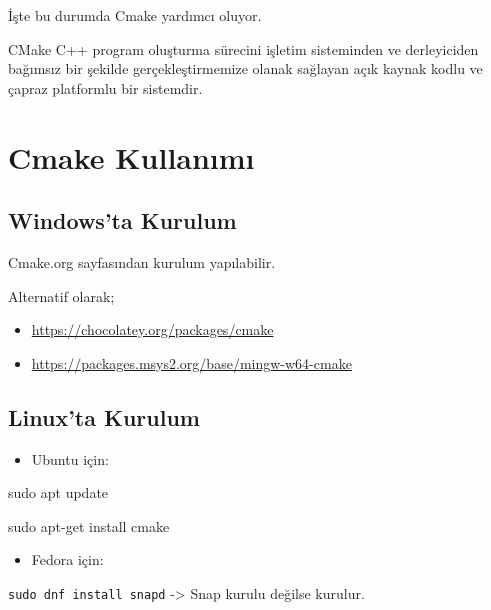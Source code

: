 \documentclass[
]{book}
\newenvironment{Shaded}{\begin{snugshade}}{\end{snugshade}}
\newcommand{\FunctionTok}[1]{\textcolor[rgb]{0.00,0.00,0.00}{#1}}
\newcommand{\NormalTok}[1]{#1}
\providecommand{\tightlist}{%
  \setlength{\itemsep}{0pt}\setlength{\parskip}{0pt}}
\begin{document}
İşte bu durumda Cmake yardımcı oluyor.

CMake C++ program oluşturma sürecini işletim sisteminden ve derleyiciden bağımsız bir şekilde gerçekleştirmemize olanak sağlayan açık kaynak kodlu ve çapraz platformlu bir sistemdir.

\hypertarget{cmake-kullanux131mux131}{%
\section{Cmake Kullanımı}\label{cmake-kullanux131mux131}}

\hypertarget{windowsta-kurulum}{%
\subsection{Windows'ta Kurulum}\label{windowsta-kurulum}}

Cmake.org sayfasından kurulum yapılabilir.

Alternatif olarak;

\begin{itemize}
\tightlist
\item
  \url{https://chocolatey.org/packages/cmake}
\item
  \url{https://packages.msys2.org/base/mingw-w64-cmake}
\end{itemize}

\hypertarget{linuxta-kurulum}{%
\subsection{Linux'ta Kurulum}\label{linuxta-kurulum}}

\begin{itemize}
\tightlist
\item
  Ubuntu için:
\end{itemize}

\begin{Shaded}
\begin{Highlighting}[]
\FunctionTok{sudo}\NormalTok{ apt update }

\FunctionTok{sudo}\NormalTok{ apt{-}get install cmake }
\end{Highlighting}
\end{Shaded}

\begin{itemize}
\tightlist
\item
  Fedora için:
\end{itemize}

\texttt{sudo\ dnf\ install\ snapd} -\textgreater{} Snap kurulu değilse kurulur.
\end{document}
